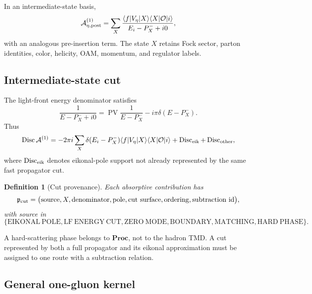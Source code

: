 \documentclass[11pt]{article}
\newtheorem{definition}{Definition}[section]
\newcommand{\Disc}{\operatorname{Disc}}
\newcommand{\PV}{\operatorname{PV}}
\newcommand{\Proc}{\mathbf{Proc}}
\newcommand{\cO}{\mathcal O}
\newcommand{\cA}{\mathcal A}
\begin{document}
In an intermediate-state basis,
\begin{equation}
 \cA_{\eta,\rm post}^{(1)}
 =\sum_X
 \frac{\langle f|V_\eta|X\rangle
       \langle X|\cO|i\rangle}
      {E_i-P_X^-+i0},
\label{eq:intermediate-state-amplitude}
\end{equation}
with an analogous pre-insertion term.  The state \(X\) retains Fock sector,
parton identities, color, helicity, OAM, momentum, and regulator labels.

\subsection{Intermediate-state cut}

The light-front energy denominator satisfies
\begin{equation}
 \frac{1}{E-P_X^-+i0}
 =\PV\frac{1}{E-P_X^-}-i\pi\delta(E-P_X^-).
\label{eq:lf-energy-distribution}
\end{equation}
Thus
\begin{equation}
 \Disc\cA^{(1)}
 =-2\pi i\sum_X
 \delta(E_i-P_X^-)
 \langle f|V_\eta|X\rangle
 \langle X|\cO|i\rangle
 +\Disc_{\rm eik}+\Disc_{\rm other},
\label{eq:rescattering-discontinuity}
\end{equation}
where \(\Disc_{\rm eik}\) denotes eikonal-pole support not already represented
by the same fast propagator cut.

\begin{definition}[Cut provenance]
\label{def:cut-provenance}
Each absorptive contribution has
\begin{equation}
 \mathfrak p_{\rm cut}
 =\bigl(
 \mathrm{source},X,\mathrm{denominator},\mathrm{pole},
 \mathrm{cut\ surface},\mathrm{ordering},\mathrm{subtraction\ id}
 \bigr),
\label{eq:cut-provenance}
\end{equation}
with source in
\begin{equation}
 \{\mathrm{EIKONAL\ POLE},\mathrm{LF\ ENERGY\ CUT},
 \mathrm{ZERO\ MODE},\mathrm{BOUNDARY},\mathrm{MATCHING},
 \mathrm{HARD\ PHASE}\}.
\label{eq:phase-source-enum}
\end{equation}
\end{definition}
A hard-scattering phase belongs to \(\Proc\), not to the hadron TMD.  A cut
represented by both a full propagator and its eikonal approximation must be
assigned to one route with a subtraction relation.

\subsection{General one-gluon kernel}
\end{document}
